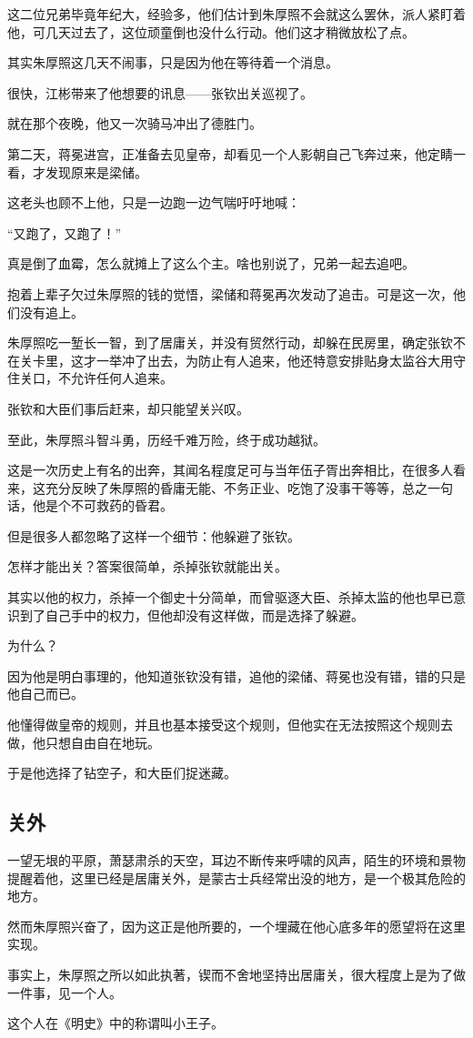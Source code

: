 \begin{multicols}{\theparacolNo}
这二位兄弟毕竟年纪大，经验多，他们估计到朱厚照不会就这么罢休，派人紧盯着他，可几天过去了，这位顽童倒也没什么行动。他们这才稍微放松了点。

其实朱厚照这几天不闹事，只是因为他在等待着一个消息。

很快，江彬带来了他想要的讯息——张钦出关巡视了。

就在那个夜晚，他又一次骑马冲出了德胜门。

第二天，蒋冕进宫，正准备去见皇帝，却看见一个人影朝自己飞奔过来，他定睛一看，才发现原来是梁储。

这老头也顾不上他，只是一边跑一边气喘吁吁地喊：

“又跑了，又跑了！”

真是倒了血霉，怎么就摊上了这么个主。啥也别说了，兄弟一起去追吧。

抱着上辈子欠过朱厚照的钱的觉悟，梁储和蒋冕再次发动了追击。可是这一次，他们没有追上。

朱厚照吃一堑长一智，到了居庸关，并没有贸然行动，却躲在民房里，确定张钦不在关卡里，这才一举冲了出去，为防止有人追来，他还特意安排贴身太监谷大用守住关口，不允许任何人追来。

张钦和大臣们事后赶来，却只能望关兴叹。

至此，朱厚照斗智斗勇，历经千难万险，终于成功越狱。

这是一次历史上有名的出奔，其闻名程度足可与当年伍子胥出奔相比，在很多人看来，这充分反映了朱厚照的昏庸无能、不务正业、吃饱了没事干等等，总之一句话，他是个不可救药的昏君。

但是很多人都忽略了这样一个细节：他躲避了张钦。

怎样才能出关？答案很简单，杀掉张钦就能出关。

其实以他的权力，杀掉一个御史十分简单，而曾驱逐大臣、杀掉太监的他也早已意识到了自己手中的权力，但他却没有这样做，而是选择了躲避。

为什么？

因为他是明白事理的，他知道张钦没有错，追他的梁储、蒋冕也没有错，错的只是他自己而已。

他懂得做皇帝的规则，并且也基本接受这个规则，但他实在无法按照这个规则去做，他只想自由自在地玩。

于是他选择了钻空子，和大臣们捉迷藏。

\subsection{关外}
一望无垠的平原，萧瑟肃杀的天空，耳边不断传来呼啸的风声，陌生的环境和景物提醒着他，这里已经是居庸关外，是蒙古士兵经常出没的地方，是一个极其危险的地方。

然而朱厚照兴奋了，因为这正是他所要的，一个埋藏在他心底多年的愿望将在这里实现。

事实上，朱厚照之所以如此执著，锲而不舍地坚持出居庸关，很大程度上是为了做一件事，见一个人。

这个人在《明史》中的称谓叫小王子。
\ifnum{}
	\end{multicols}
\fi
\newpage
